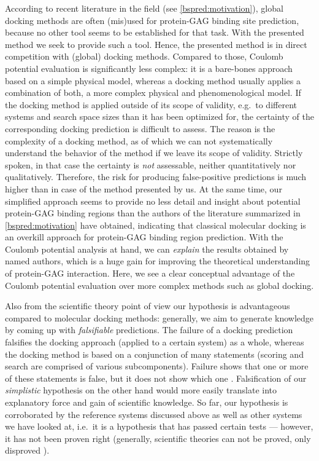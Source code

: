 According to recent literature in the field (see \cref{bspred:motivation}),
global docking methods are often (mis)used for protein-GAG binding site
prediction, because no other tool seems to be established for that task. With
the presented method we seek to provide such a tool. Hence, the presented method
is in direct competition with (global) docking methods. Compared to those,
Coulomb potential evaluation is significantly less complex: it is a bare-bones
approach based on a simple physical model, whereas a docking method usually
applies a combination of both, a more complex physical and phenomenological
model. If the docking method is applied outside of its scope of validity, e.g.\
to different systems and search space sizes than it has been optimized for, the
certainty of the corresponding docking prediction is difficult to assess. The
reason is the complexity of a docking method, as of which we can not
systematically understand the behavior of the method if we leave its scope of
validity. Strictly spoken, in that case the certainty is \textit{not}
assessable, neither quantitatively nor qualitatively. Therefore, the risk for
producing false-positive predictions is much higher than in case of the method
presented by us. At the same time, our simplified approach seems to provide no
less detail and insight about potential protein-GAG binding regions than the
authors of the literature summarized in \cref{bspred:motivation} have obtained,
indicating that classical molecular docking is an overkill approach for
protein-GAG binding region prediction. With the Coulomb potential analysis at
hand, we can \textit{explain} the results obtained by named authors, which is a
huge gain for improving the theoretical understanding of protein-GAG
interaction. Here, we see a clear conceptual advantage of the Coulomb potential
evaluation over more complex methods such as global docking.

Also from the scientific theory point of view our hypothesis is advantageous
compared to molecular docking methods: generally, we aim to generate knowledge
by coming up with \textit{falsifiable} predictions. The failure of a docking
prediction falsifies the docking approach (applied to a certain system) as a
whole, whereas the docking method is based on a conjunction of many statements
(scoring and search are comprised of various subcomponents). Failure shows that
one or more of these statements is false, but it does not show which one
\cite{savage1990scientific}. Falsification of our \textit{simplistic} hypothesis
on the other hand would more easily translate into explanatory force and gain of
scientific knowledge. So far, our hypothesis is corroborated by the reference
systems discussed above as well as other systems we have looked at, i.e.\ it is
a hypothesis that has passed certain tests --- however, it has not been proven
right (generally, scientific theories can not be proved, only disproved
\cite{schafersman_scientific_method}).

